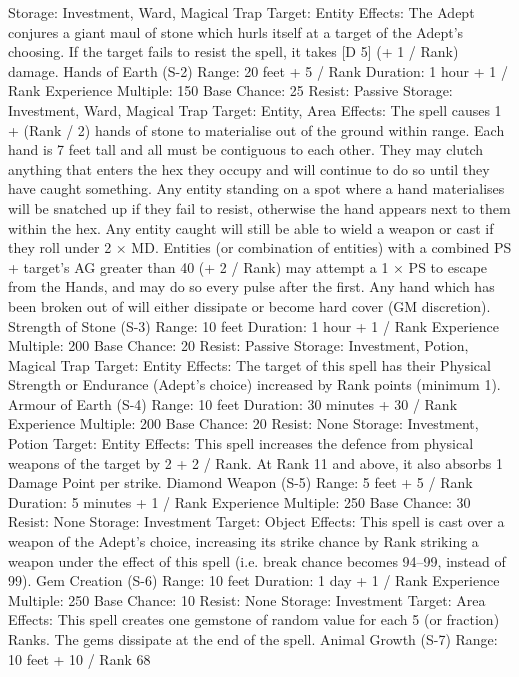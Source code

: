 \documentclass[a4paper]{article}
\begin{document}
\begin{multicols}{3}
Storage: Investment, Ward, Magical Trap
Target: Entity
Effects: The Adept conjures a giant maul of stone
which hurls itself at a target of the Adept’s choosing. If the target fails to resist the spell, it takes [D 5] (+ 1 / Rank) damage.
Hands of Earth (S-2)
Range: 20 feet + 5 / Rank
Duration: 1 hour + 1 / Rank
Experience Multiple: 150
Base Chance: 25%
Resist: Passive
Storage: Investment, Ward, Magical Trap
Target: Entity, Area
Effects: The spell causes 1 + (Rank / 2) hands of
stone to materialise out of the ground within range.
Each hand is 7 feet tall and all must be contiguous
to each other. They may clutch anything that enters
the hex they occupy and will continue to do so
until they have caught something. Any entity
standing on a spot where a hand materialises will
be snatched up if they fail to resist, otherwise the
hand appears next to them within the hex. Any
entity caught will still be able to wield a weapon or
cast if they roll under 2 × MD. Entities (or combination of entities) with a combined PS + target’s
AG greater than 40 (+ 2 / Rank) may attempt a 1 ×
PS to escape from the Hands, and may do so every
pulse after the first. Any hand which has been
broken out of will either dissipate or become hard
cover (GM discretion).
Strength of Stone (S-3)
Range: 10 feet
Duration: 1 hour + 1 / Rank
Experience Multiple: 200
Base Chance: 20%
Resist: Passive
Storage: Investment, Potion, Magical Trap
Target: Entity
Effects: The target of this spell has their Physical
Strength or Endurance (Adept’s choice) increased
by Rank points (minimum 1).
Armour of Earth (S-4)
Range: 10 feet
Duration: 30 minutes + 30 / Rank
Experience Multiple: 200
Base Chance: 20%
Resist: None
Storage: Investment, Potion
Target: Entity
Effects: This spell increases the defence from
physical weapons of the target by 2 + 2 / Rank. At
Rank 11 and above, it also absorbs 1 Damage Point
per strike.
Diamond Weapon (S-5)
Range: 5 feet + 5 / Rank
Duration: 5 minutes + 1 / Rank
Experience Multiple: 250
Base Chance: 30%
Resist: None
Storage: Investment
Target: Object
Effects: This spell is cast over a weapon of the
Adept’s choice, increasing its strike chance by
Rank%
striking a weapon under the effect of this spell (i.e.
break chance becomes 94–99, instead of 99).
Gem Creation (S-6)
Range: 10 feet
Duration: 1 day + 1 / Rank
Experience Multiple: 250
Base Chance: 10%
Resist: None
Storage: Investment
Target: Area
Effects: This spell creates one gemstone of random
value for each 5 (or fraction) Ranks. The gems
dissipate at the end of the spell.
Animal Growth (S-7)
Range: 10 feet + 10 / Rank
68


\end{multicols}
\end{document}
